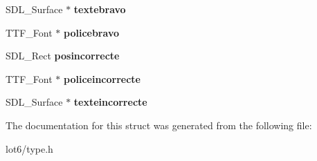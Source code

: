 \begin{DoxyCompactItemize}
\item 
S\+D\+L\+\_\+\+Surface $\ast$ {\bfseries textebravo}\hypertarget{structenigme_a09b53fa41d97fb5cb9a970798428258f}{}\label{structenigme_a09b53fa41d97fb5cb9a970798428258f}

\item 
T\+T\+F\+\_\+\+Font $\ast$ {\bfseries policebravo}\hypertarget{structenigme_abf756a2f29a81805e5b56d90366dc6ce}{}\label{structenigme_abf756a2f29a81805e5b56d90366dc6ce}

\item 
S\+D\+L\+\_\+\+Rect {\bfseries posincorrecte}\hypertarget{structenigme_a0d0604efc06bac24975ff24623e8b547}{}\label{structenigme_a0d0604efc06bac24975ff24623e8b547}

\item 
T\+T\+F\+\_\+\+Font $\ast$ {\bfseries policeincorrecte}\hypertarget{structenigme_af37fcd4fa7190184d2b8e06ab031a471}{}\label{structenigme_af37fcd4fa7190184d2b8e06ab031a471}

\item 
S\+D\+L\+\_\+\+Surface $\ast$ {\bfseries texteincorrecte}\hypertarget{structenigme_a4c20af04bbfb38fc9c528a8d89bcc2d8}{}\label{structenigme_a4c20af04bbfb38fc9c528a8d89bcc2d8}

\end{DoxyCompactItemize}


The documentation for this struct was generated from the following file\+:\begin{DoxyCompactItemize}
\item 
lot6/type.\+h\end{DoxyCompactItemize}
